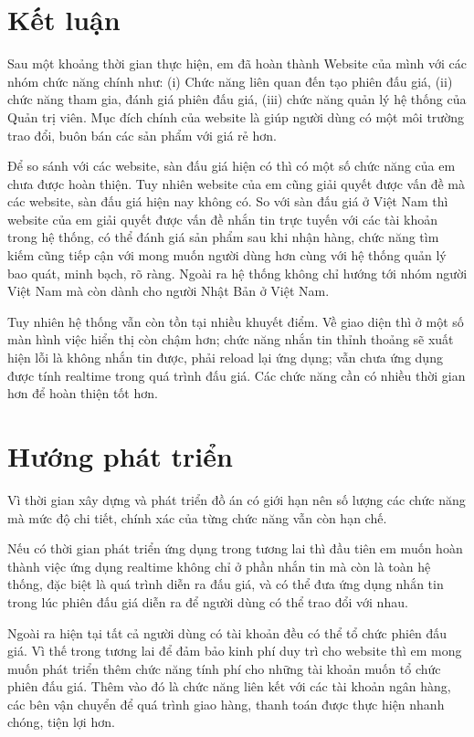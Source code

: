 \documentclass[../DoAn.tex]{subfiles}
\begin{document}
\section{Kết luận}
Sau một khoảng thời gian thực hiện, em đã hoàn thành Website của mình với các nhóm chức năng chính như: (i) Chức năng liên quan đến tạo phiên đấu giá, (ii) chức năng tham gia, đánh giá phiên đấu giá, (iii) chức năng quản lý hệ thống của Quản trị viên. Mục đích chính của website là giúp người dùng có một môi trường trao đổi, buôn bán các sản phẩm với giá rẻ hơn. 

Để so sánh với các website, sàn đấu giá hiện có thì có một số chức năng của em chưa được hoàn thiện. Tuy nhiên website của em cũng giải quyết được vấn đề mà các website, sàn đấu giá hiện nay không có. So với sàn đấu giá ở Việt Nam thì website của em giải quyết được vấn đề nhắn tin trực tuyến với các tài khoản trong hệ thống, có thể đánh giá sản phẩm sau khi nhận hàng, chức năng tìm kiếm cũng tiếp cận với mong muốn người dùng hơn cùng với hệ thống quản lý bao quát, minh bạch, rõ ràng. Ngoài ra hệ thống không chỉ hướng tới nhóm người Việt Nam mà còn dành cho người Nhật Bản ở Việt Nam.

Tuy nhiên hệ thống vẫn còn tồn tại nhiều khuyết điểm. Về giao diện thì ở một số màn hình việc hiển thị còn chậm hơn; chức năng nhắn tin thỉnh thoảng sẽ xuất hiện lỗi là không nhắn tin được, phải reload lại ứng dụng; vẫn chưa ứng dụng được tính realtime trong quá trình đấu giá. Các chức năng cần có nhiều thời gian hơn để hoàn thiện tốt hơn.
\section{Hướng phát triển}
Vì thời gian xây dựng và phát triển đồ án có giới hạn nên số lượng các chức năng mà mức độ chi tiết, chính xác của từng chức năng vẫn còn hạn chế. 

Nếu có thời gian phát triển ứng dụng trong tương lai thì đầu tiên em muốn hoàn thành việc ứng dụng realtime không chỉ ở phần nhắn tin mà còn là toàn hệ thống, đặc biệt là quá trình diễn ra đấu giá, và có thể đưa ứng dụng nhắn tin trong lúc phiên đấu giá diễn ra để người dùng có thể trao đổi với nhau. 

Ngoài ra hiện tại tất cả người dùng có tài khoản đều có thể tổ chức phiên đấu giá. Vì thế trong tương lai để đảm bảo kinh phí duy trì cho website thì em mong muốn phát triển thêm chức năng tính phí cho những tài khoản muốn tổ chức phiên đấu giá. Thêm vào đó là chức năng liên kết với các tài khoản ngân hàng, các bên vận chuyển để quá trình giao hàng, thanh toán được thực hiện nhanh chóng, tiện lợi hơn. 
\end{document}
